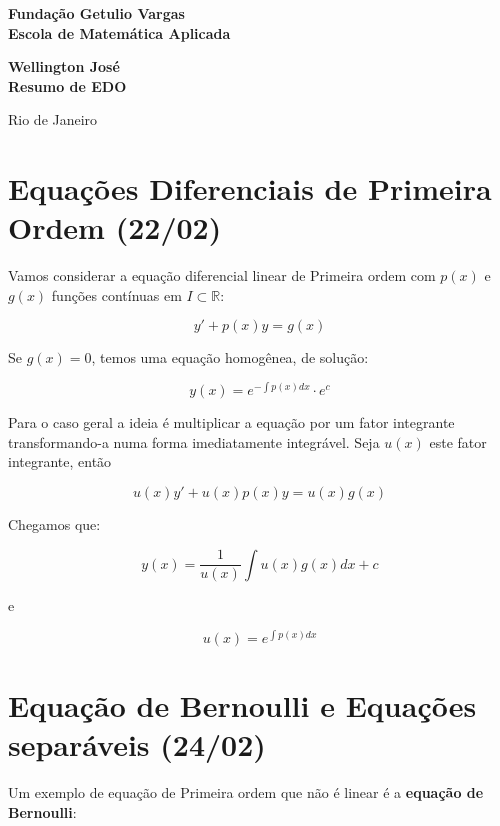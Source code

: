 \documentclass[12pt]{article}
\begin{document}
\begin{titlepage}
\begin{center}
\textbf{\LARGE Fundação Getulio Vargas}\\ 
\textbf{\LARGE Escola de Matemática Aplicada}

\par
\vspace{170pt}
\textbf{\Large Wellington José}\\
\vspace{32pt}
\textbf{\Large Resumo de EDO}\\
\end{center}

\par
\vfill
\begin{center}
{{\normalsize Rio de Janeiro}\\
{\normalsize \the\year}}
\end{center}
\end{titlepage}

\section{Equações Diferenciais de Primeira Ordem (22/02)}
Vamos considerar a equação diferencial linear de Primeira ordem com $p(x)$ e $g(x)$ funções contínuas em $I \subset \mathbb{R}$:

$$y' + p(x) y = g(x)$$

Se $g(x) = 0$, temos uma equação homogênea, de solução:

$$y(x) = e^{-\int p(x) d x} \cdot e^c$$

Para o caso geral a ideia é multiplicar a equação por um fator integrante transformando-a numa forma imediatamente integrável. Seja $u(x)$ este fator integrante, então

$$u(x) y' + u(x) p(x) y = u(x) g(x)$$

Chegamos que:

$$y(x) = \dfrac{1}{u(x)} \int u(x) g(x) d x + c$$

e

$$u(x) = e^{\int p(x) d x}$$

\section{Equação de Bernoulli e Equações separáveis (24/02)}

Um exemplo de equação de Primeira ordem que não é linear é a \textbf{equação de Bernoulli}:
\end{document}

